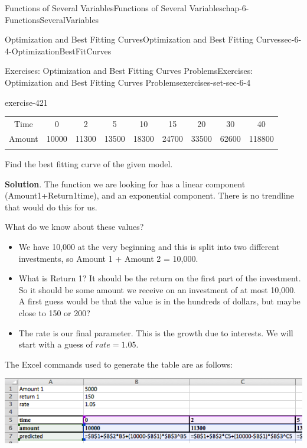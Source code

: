 \documentclass[oneside,10pt,]{book}
\numberwithin{equation}{section}
\newcommand{\hrulethin}  {\noalign{\hrule height 0.04em}}
\begin{document}
\begin{chapterptx}{Functions of Several Variables}{}{Functions of Several Variables}{}{}{chap-6-FunctionsSeveralVariables}
\begin{sectionptx}{Optimization and Best Fitting Curves}{}{Optimization and Best Fitting Curves}{}{}{sec-6-4-OptimizationBestFitCurves}
\begin{exercises-subsection-numberless}{Exercises: Optimization and Best Fitting Curves Problems}{}{Exercises: Optimization and Best Fitting Curves Problems}{}{}{exercises-set-sec-6-4}
\begin{divisionexercise}{7}{}{}{exercise-421}
\begin{sidebyside}{1}{0}{0}{0}
\begin{sbspanel}{1}
{\begin{tabular}{ccccccccc}
Time&0&2&5&10&15&20&30&40\tabularnewline\hrulethin
Amount&\textdollar{}10000&\textdollar{}11300&\textdollar{}13500&\textdollar{}18300&\textdollar{}24700&\textdollar{}33500&\textdollar{}62600&\textdollar{}118800\tabularnewline\hrulethin
\end{tabular}
\par}
\end{sbspanel}%
\end{sidebyside}%
\par
\hypertarget{p-2519}{}%
Find the best fitting curve of the given model.%
\par\smallskip%
\noindent\textbf{Solution}.\hypertarget{solution-213}{}\quad%
\hypertarget{p-2520}{}%
The function we are looking for has a linear component (Amount1+Return1\textasteriskcentered{}time), and an exponential component. There is no trendline that would do this for us.%
\par
\hypertarget{p-2521}{}%
What do we know about these values?%
\leavevmode%
\begin{itemize}[label=\textbullet]
\item{}\hypertarget{p-2522}{}%
We have \textdollar{}10,000 at the very beginning and this is split into two different investments, so Amount 1 + Amount 2 = \textdollar{}10,000.%
\item{}\hypertarget{p-2523}{}%
What is Return 1? It should be the return on the first part of the investment. So it should be some amount we receive on an investment of at most \textdollar{}10,000. A first guess would be that the value is in the hundreds of dollars, but maybe close to \textdollar{}150 or \textdollar{}200?%
\item{}\hypertarget{p-2524}{}%
The rate is our final parameter. This is the growth due to interests. We will start with a guess of \(rate = 1.05\).%
\end{itemize}
\hypertarget{p-2525}{}%
The Excel commands used to generate the table are as follows:%
\begin{sidebyside}{1}{0}{0}{0}%
\begin{sbspanel}{1}%
\includegraphics[width=1\linewidth]{images/sec6-4-sol7a.png}
\end{sbspanel}%
\end{sidebyside}%

\end{divisionexercise}
\end{exercises-subsection-numberless}
\end{sectionptx}
\end{chapterptx}
\end{document}
